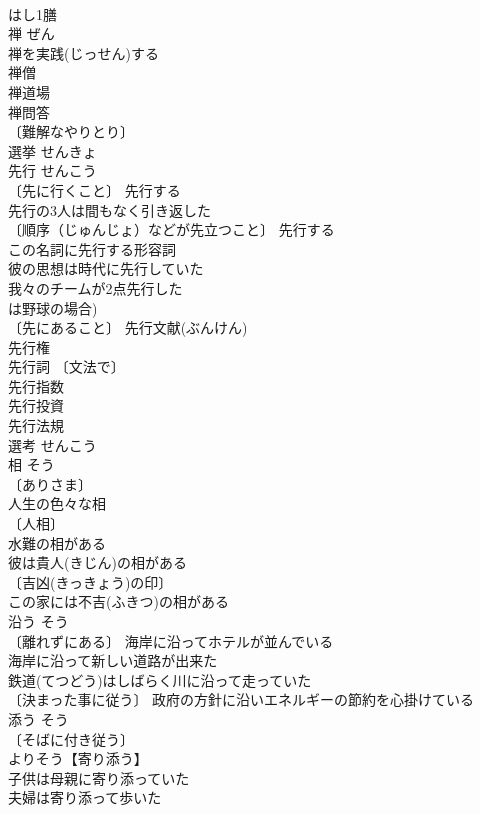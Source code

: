 \documentclass[8pt]{extreport}
\begin{document}
\begin{CJK}{UTF8}{min}
\\	はし1膳 
\\	禅	ぜん	
\\	禅を実践(じっせん)する 
\\	禅僧 
\\	禅道場 
\\	禅問答 
\\	〔難解なやりとり〕 
\\	選挙	せんきょ	
\\	先行	せんこう	
\\	〔先に行くこと〕 先行する 
\\	先行の3人は間もなく引き返した 
\\	〔順序（じゅんじょ）などが先立つこと〕 先行する 
\\	この名詞に先行する形容詞 
\\	彼の思想は時代に先行していた 
\\	我々のチームが2点先行した 
\\	は野球の場合) 
\\	〔先にあること〕 先行文献(ぶんけん) 
\\	先行権 
\\	先行詞 〔文法で〕
\\	先行指数 
\\	先行投資 
\\	先行法規 
\\	選考	せんこう	
\\	相	そう	
\\	〔ありさま〕 
\\	人生の色々な相 
\\	〔人相〕
\\	水難の相がある 
\\	彼は貴人(きじん)の相がある 
\\	〔吉凶(きっきょう)の印〕
\\	この家には不吉(ふきつ)の相がある 
\\	沿う	そう	
\\	〔離れずにある〕 海岸に沿ってホテルが並んでいる 
\\	海岸に沿って新しい道路が出来た 
\\	鉄道(てつどう)はしばらく川に沿って走っていた 
\\	〔決まった事に従う〕 政府の方針に沿いエネルギーの節約を心掛けている 
\\	添う	そう	
\\	〔そばに付き従う〕
\\	よりそう【寄り添う】 
\\	子供は母親に寄り添っていた 
\\	夫婦は寄り添って歩いた 

\end{CJK}
\end{document}
